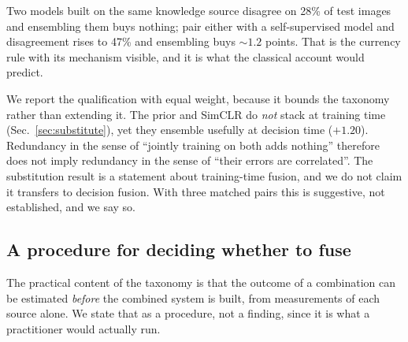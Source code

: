 Two models built on the same knowledge source disagree on 28\% of test images
and ensembling them buys nothing; pair either with a self-supervised model and
disagreement rises to 47\% and ensembling buys ${\sim}1.2$ points. That is the
currency rule with its mechanism visible, and it is what the classical account
would predict.

We report the qualification with equal weight, because it bounds the taxonomy
rather than extending it. The prior and SimCLR do \emph{not} stack at training
time (Sec.~\ref{sec:substitute}), yet they ensemble usefully at decision
time ($+1.20$). Redundancy in the sense of ``jointly training on both adds
nothing'' therefore does not imply redundancy in the sense of ``their errors
are correlated''. The substitution result is a statement about training-time
fusion, and we do not claim it transfers to decision fusion. With three matched
pairs this is suggestive, not established, and we say so.

\subsection{A procedure for deciding whether to fuse}\label{sec:procedure}
The practical content of the taxonomy is that the outcome of a combination can
be estimated \emph{before} the combined system is built, from measurements of
each source alone. We state that as a procedure, not a finding, since it is
what a practitioner would actually run.


